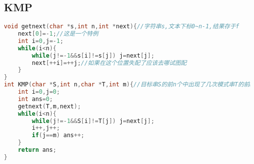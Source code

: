 \subsection{KMP}
\begin{lstlisting}[language=C]
void getnext(char *s,int n,int *next){//字符串s,文本下标0~n-1,结果存于f
	next[0]=-1;//这是一个特例
	int i=0,j=-1;
	while(i<n){
		while(j!=-1&&s[i]!=s[j]) j=next[j];
		next[++i]=++j;//如果在这个位置失配了应该去哪试图配
	}
}
int KMP(char *S,int n,char *T,int m){//目标串S的前n个中出现了几次模式串T的前m个
	int i=0,j=0;
	int ans=0;
	getnext(T,m,next);
	while(i<n){
		while(j!=-1&&S[i]!=T[j]) j=next[j];
		i++,j++;
		if(j==m) ans++;
	}
	return ans;
}
\end{lstlisting} 
